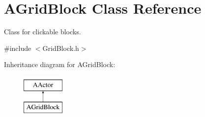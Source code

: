 \hypertarget{class_a_grid_block}{}\section{A\+Grid\+Block Class Reference}
\label{class_a_grid_block}


Class for clickable blocks.  




{\ttfamily \#include $<$Grid\+Block.\+h$>$}

Inheritance diagram for A\+Grid\+Block\+:\begin{figure}[H]
\begin{center}
\leavevmode
\includegraphics[height=2.000000cm]{class_a_grid_block}
\end{center}
\end{figure}
